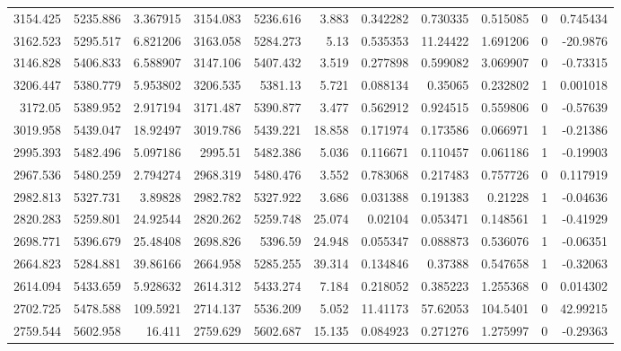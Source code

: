 {\begin{center}
\begin{longtable}{rrrrrrrrrrr}
    3154.425 & 5235.886 & 3.367915 & 3154.083 & 5236.616 & 3.883 & 0.342282 & 0.730335 & 0.515085 & 0  & 0.745434 \\
    3162.523 & 5295.517 & 6.821206 & 3163.058 & 5284.273 & 5.13 & 0.535353 & 11.24422 & 1.691206 & 0  & \cellcolor[rgb]{ 1,  .922,  .612}\textcolor[rgb]{ .612,  .396,  0}{-20.9876} \\
    3146.828 & 5406.833 & 6.588907 & 3147.106 & 5407.432 & 3.519 & 0.277898 & 0.599082 & 3.069907 & 0  & -0.73315 \\
    3206.447 & 5380.779 & 5.953802 & 3206.535 & 5381.13 & 5.721 & 0.088134 & 0.35065 & 0.232802 & \cellcolor[rgb]{ 0,  1,  0}1 & 0.001018 \\
    3172.05 & 5389.952 & 2.917194 & 3171.487 & 5390.877 & 3.477 & 0.562912 & 0.924515 & 0.559806 & 0  & -0.57639 \\
    3019.958 & 5439.047 & 18.92497 & 3019.786 & 5439.221 & 18.858 & 0.171974 & 0.173586 & 0.066971 & \cellcolor[rgb]{ 0,  1,  0}1 & -0.21386 \\
    2995.393 & 5482.496 & 5.097186 & 2995.51 & 5482.386 & 5.036 & 0.116671 & 0.110457 & 0.061186 & \cellcolor[rgb]{ 0,  1,  0}1 & -0.19903 \\
    2967.536 & 5480.259 & 2.794274 & 2968.319 & 5480.476 & 3.552 & 0.783068 & 0.217483 & 0.757726 & 0  & 0.117919 \\
    2982.813 & 5327.731 & 3.89828 & 2982.782 & 5327.922 & 3.686 & 0.031388 & 0.191383 & 0.21228 & \cellcolor[rgb]{ 0,  1,  0}1 & -0.04636 \\
    2820.283 & 5259.801 & 24.92544 & 2820.262 & 5259.748 & 25.074 & 0.02104 & 0.053471 & 0.148561 & \cellcolor[rgb]{ 0,  1,  0}1 & -0.41929 \\
    2698.771 & 5396.679 & 25.48408 & 2698.826 & 5396.59 & 24.948 & 0.055347 & 0.088873 & 0.536076 & \cellcolor[rgb]{ 0,  1,  0}1 & -0.06351 \\
    2664.823 & 5284.881 & 39.86166 & 2664.958 & 5285.255 & 39.314 & 0.134846 & 0.37388 & 0.547658 & \cellcolor[rgb]{ 0,  1,  0}1 & -0.32063 \\
    2614.094 & 5433.659 & 5.928632 & 2614.312 & 5433.274 & 7.184 & 0.218052 & 0.385223 & 1.255368 & 0  & 0.014302 \\
    2702.725 & 5478.588 & 109.5921 & 2714.137 & 5536.209 & 5.052 & 11.41173 & 57.62053 & 104.5401 & 0  & \cellcolor[rgb]{ 1,  .922,  .612}\textcolor[rgb]{ .612,  .396,  0}{42.99215} \\
    2759.544 & 5602.958 & 16.411 & 2759.629 & 5602.687 & 15.135 & 0.084923 & 0.271276 & 1.275997 & 0  & -0.29363 \\

\end{longtable}
\end{center}}
